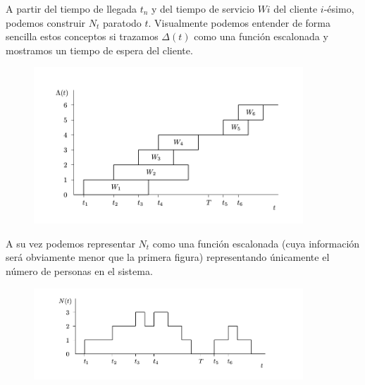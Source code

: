 \documentclass[8pt]{beamer}
\begin{document}
  \begin{frame}
    A partir del tiempo de llegada ${t_n}$ y del tiempo de servicio ${W i}$ del cliente $i$-ésimo, podemos 
    construir ${N_t}$ paratodo $t$. Visualmente podemos entender de forma sencilla estos conceptos si trazamos 
    ${\Delta (t)}$ como una función escalonada y mostramos un tiempo de espera del cliente.

    \begin{figure}[H]
      \begin{center}
        \includegraphics[width=0.9\textwidth]{./imgs/fig1.png}
      \end{center}
    \end{figure}

  \end{frame}

  \begin{frame}
    A su vez podemos representar $N_t$ como una función escalonada (cuya información será obviamente menor que la primera figura) 
    representando únicamente el número de personas en el sistema.

    \begin{figure}[H]
      \begin{center}
        \includegraphics[width=0.9\textwidth]{./imgs/fig2.png}
      \end{center}
    \end{figure}
  \end{frame}
\end{document}

